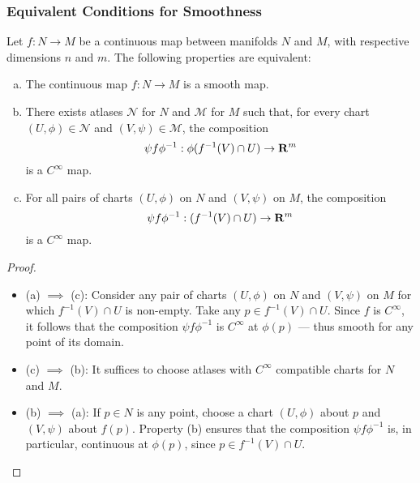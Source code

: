 \subsubsection{Equivalent Conditions for Smoothness}

\begin{proposition}
    \label{prop:equiv-conditions-for-smooth}
    Let \(f: N \to M\) be a continuous map between manifolds \(N\) and \(M\), with
    respective dimensions \(n\) and \(m\). The following properties are equivalent:
    \begin{enumerate}[(a)]\setlength\itemsep{0em}
        \item The continuous map \(f: N \to M\) is a smooth map.

        \item There exists atlases \(\mathcal{N}\) for \(N\) and \(\mathcal{M}\) for
              \(M\) such that, for every chart \((U, \phi) \in \mathcal{N}\) and
              \((V, \psi) \in \mathcal{M}\), the composition
              \[
                  \psi f \phi^{-1}: \phi(f^{-1}(V) \cap U) \to \mathbf{R}^m
              \]
              is a \(C^{\infty}\) map.

        \item For all pairs of charts \((U, \phi)\) on \(N\) and \((V, \psi)\) on \(M\),
              the composition
              \[
                  \psi f \phi^{-1}: (f^{-1}(V) \cap U) \to  \mathbf{R}^m
              \]
              is a \(C^{\infty}\) map.
    \end{enumerate}
\end{proposition}

\begin{proof}
    \begin{itemize}\setlength\itemsep{0em}
        \item (a) \(\implies\) (c): Consider any pair of charts \((U, \phi)\) on \(N\)
              and \((V, \psi)\) on \(M\) for which \(f^{-1}(V) \cap U\) is non-empty. Take
              any \(p \in f^{-1}(V) \cap U\). Since \(f\) is \(C^{\infty}\), it follows that
              the composition \(\psi f \phi^{-1}\) is \(C^{\infty}\) at \(\phi(p)\) --- thus
              smooth for any point of its domain.

        \item (c) \(\implies\) (b): It suffices to choose atlases with \(C^{\infty}\)
              compatible charts for \(N\) and \(M\).

        \item (b) \(\implies\) (a): If \(p \in N\) is any point, choose a chart \((U,
              \phi)\) about \(p\) and \((V, \psi)\) about \(f(p)\). Property (b) ensures
              that the composition \(\psi f \phi^{-1}\) is, in particular, continuous at
              \(\phi(p)\), since \(p \in f^{-1}(V) \cap U\).
    \end{itemize}
\end{proof}

